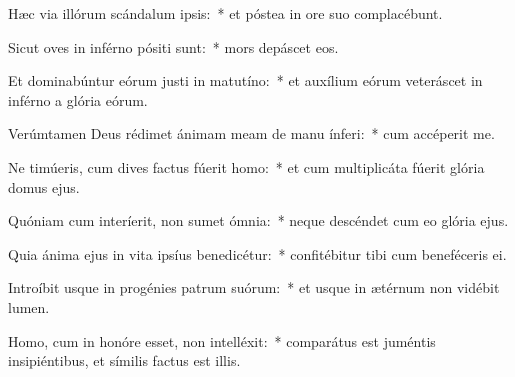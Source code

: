 
\item Hæc via illórum scándalum ipsis:~* et póstea in ore suo complacébunt.

\item Sicut oves in inférno pósiti sunt:~* mors depáscet eos.

\item Et dominabúntur eórum justi in matutíno:~* et auxílium eórum veteráscet in inférno a glória eórum.

\item Verúmtamen Deus rédimet ánimam meam de manu ínferi:~* cum accéperit me.

\item Ne timúeris, cum dives factus fúerit homo:~* et cum multiplicáta fúerit glória domus ejus.

\item Quóniam cum interíerit, non sumet ómnia:~* neque descéndet cum eo glória ejus.

\item Quia ánima ejus in vita ipsíus benedicétur:~* confitébitur tibi cum beneféceris ei.

\item Introíbit usque in progénies patrum suórum:~* et usque in ætérnum non vidébit lumen.

\item Homo, cum in honóre esset, non intelléxit:~* comparátus est juméntis insipiéntibus, et símilis factus est illis.